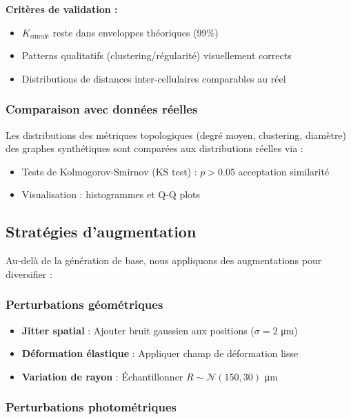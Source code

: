 \textbf{Critères de validation :}
\begin{itemize}
    \item $K_{\text{simulé}}$ reste dans enveloppes théoriques (99\%)
    \item Patterns qualitatifs (clustering/régularité) visuellement corrects
    \item Distributions de distances inter-cellulaires comparables au réel
\end{itemize}

\subsubsection{Comparaison avec données réelles}

Les distributions des métriques topologiques (degré moyen, clustering, diamètre) des graphes synthétiques sont comparées aux distributions réelles via :
\begin{itemize}
    \item Tests de Kolmogorov-Smirnov (KS test) : $p > 0.05$ acceptation similarité
    \item Visualisation : histogrammes et Q-Q plots
\end{itemize}

\subsection{Stratégies d'augmentation}

Au-delà de la génération de base, nous appliquons des augmentations pour diversifier :

\subsubsection{Perturbations géométriques}

\begin{itemize}
    \item \textbf{Jitter spatial} : Ajouter bruit gaussien aux positions ($\sigma = 2$ μm)
    \item \textbf{Déformation élastique} : Appliquer champ de déformation lisse
    \item \textbf{Variation de rayon} : Échantillonner $R \sim \mathcal{N}(150, 30)$ μm
\end{itemize}

\subsubsection{Perturbations photométriques}

